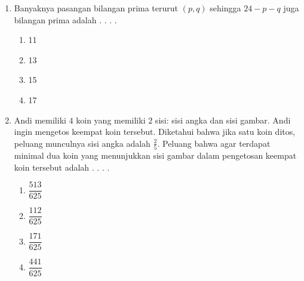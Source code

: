 \documentclass[12pt]{scrartcl}
\begin{document}
\begin{enumerate}
    \item Banyaknya pasangan bilangan prima terurut $(p,q)$ sehingga $24-p-q$ juga bilangan prima adalah . . . .
    \begin{enumerate}[label={(\Alph*)}]
        \item 11 \item 13 \item 15 \item 17
    \end{enumerate}

    \item Andi memiliki $4$ koin yang memiliki $2$ sisi: sisi angka dan sisi gambar. Andi ingin mengetos keempat koin tersebut. Diketahui bahwa jika satu koin ditos, peluang munculnya sisi angka adalah $\frac{2}{5}$. Peluang bahwa agar terdapat minimal dua koin yang menunjukkan sisi gambar dalam pengetosan keempat koin tersebut adalah . . . .
    \begin{enumerate}[label={(\Alph*)}]
        \item $\dfrac{513}{625}$ \item $\dfrac{112}{625}$ \item $\dfrac{171}{625}$ \item $\dfrac{441}{625}$
    \end{enumerate}
\end{enumerate}
\end{document}
